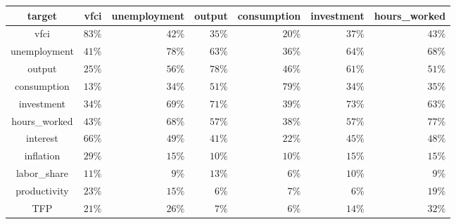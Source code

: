 \begin{longtable}{crrrrrr}
\toprule
target & vfci & unemployment & output & consumption & investment & hours\_worked \\ 
\midrule\addlinespace[2.5pt]
vfci & $83\%$ & $42\%$ & $35\%$ & $20\%$ & $37\%$ & $43\%$ \\ 
unemployment & $41\%$ & $78\%$ & $63\%$ & $36\%$ & $64\%$ & $68\%$ \\ 
output & $25\%$ & $56\%$ & $78\%$ & $46\%$ & $61\%$ & $51\%$ \\ 
consumption & $13\%$ & $34\%$ & $51\%$ & $79\%$ & $34\%$ & $35\%$ \\ 
investment & $34\%$ & $69\%$ & $71\%$ & $39\%$ & $73\%$ & $63\%$ \\ 
hours\_worked & $43\%$ & $68\%$ & $57\%$ & $38\%$ & $57\%$ & $77\%$ \\ 
interest & $66\%$ & $49\%$ & $41\%$ & $22\%$ & $45\%$ & $48\%$ \\ 
inflation & $29\%$ & $15\%$ & $10\%$ & $10\%$ & $15\%$ & $15\%$ \\ 
labor\_share & $11\%$ & $9\%$ & $13\%$ & $6\%$ & $10\%$ & $9\%$ \\ 
productivity & $23\%$ & $15\%$ & $6\%$ & $7\%$ & $6\%$ & $19\%$ \\ 
TFP & $21\%$ & $26\%$ & $7\%$ & $6\%$ & $14\%$ & $32\%$ \\ 
\bottomrule
\end{longtable}
